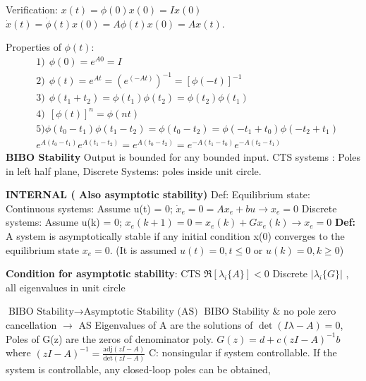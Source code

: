 Verification: $x(t)=\phi(0)x(0)=Ix(0)$ 
$\dot{x}(t)=\dot{\phi}(t)x(0)=A\phi(t)x(0)=Ax(t)$. 

Properties of $\phi(t)$:
\vspace*{-0.4cm}
\begin{align*}
& 1) \ \ \phi(0)=e^{A0}=I \\
& 2) \ \ \phi(t) = e^{At} = (e^{(-At)})^{-1}=[\phi(-t)]^{-1} \\
& 3) \ \ \phi(t_1+t_2)=\phi(t_1)\phi(t_2)=\phi(t_2)\phi(t_1) \\
& 4) \ \ [\phi(t)]^n = \phi(nt) \\
& 5) \phi(t_0-t_1)\phi(t_1-t_2)=\phi(t_0-t_2)=\phi(-t_1+t_0)\phi(-t_2+t_1) \\
& e^{A(t_0-t_1)}e^{A(t_1-t_2)} = e^{A(t_0-t_2)}=e^{-A(t_1-t_0)}e^{-A(t_2-t_1)}
\end{align*}%
%
\textbf{BIBO Stability}
Output is bounded for any bounded input.
CTS systems : Poles in left half plane, Discrete Systems: poles inside unit circle.

\textbf{INTERNAL ( Also asymptotic stability)}
Def: Equilibrium state:
 Continuous systems: Assume u(t) = 0;
 $\dot{x}_e=0=Ax_e+bu \rightarrow x_e=0$ \hfill \break 
  Discrete systems: Assume u(k) = 0;
 $x_e(k+1)=0=x_e(k)+Gx_e(k) \rightarrow x_e=0$ \hfill \break
\textbf{Def:} A system is asymptotically stable if any initial condition x(0) converges to
the equilibrium state $x_e=0$.
 (It is assumed $u(t) = 0,t \leq0$  or $u(k)=0, k\geq 0$)
 
 \textbf{Condition for asymptotic stability}: \hfill \break CTS $\Re[\lambda_i\{A\}]<0$ \hfill \break Discrete $|\lambda_i 
 \{G\}|$
, all eigenvalues in unit circle


$\text{BIBO Stability} \rightarrow \text{Asymptotic Stability (AS)}$ \hfill \break
BIBO Stability \& no pole zero cancellation $\rightarrow $ AS \hfill \break 
%
Eigenvalues of A are the solutions of $\det(I\lambda -A) = 0$, \hfill \break
Poles of G(z) are the zeros of denominator poly. 
$G(z)=d+c(zI-A)^{-1}b$ where $(zI-A)^{-1}=\frac{\text{adj}(zI-A)}{\text{det}(zI-A)}$
C: nonsingular if system controllable. If the system is controllable,
any closed-loop poles can be obtained, %

